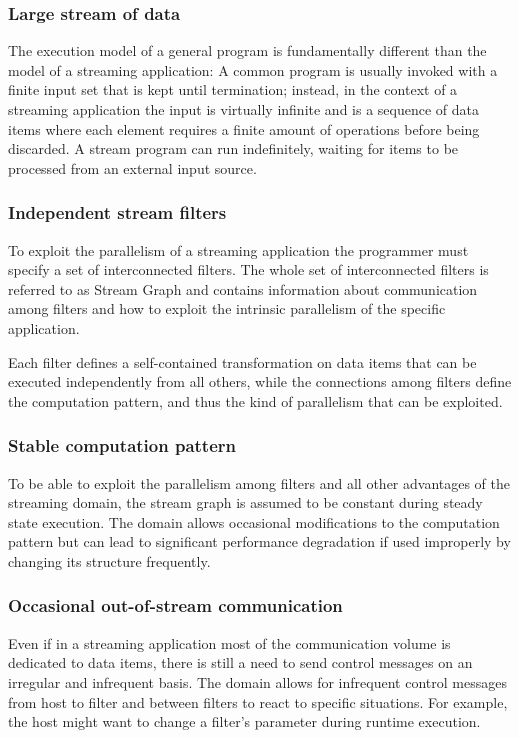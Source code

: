 \documentclass[../main.tex]{subfiles}
\begin{document}
\subsubsection{Large stream of data}
The execution model of a general program is fundamentally different than the model of a streaming application: A common program is usually invoked with a finite input set that is kept until termination; instead, in the context of a streaming application the input is virtually infinite and is a sequence of data items where each element requires a finite amount of operations before being discarded. A stream program can run indefinitely, waiting for items to be processed from an external input source.

\subsubsection{Independent stream filters}
To exploit the parallelism of a streaming application the programmer must specify a set of interconnected filters. The whole set of interconnected filters is referred to as Stream Graph and contains information about communication among filters and how to exploit the intrinsic parallelism of the specific application.

Each filter defines a self-contained transformation on data items that can be executed independently from all others, while the connections among filters define the computation pattern, and thus the kind of parallelism that can be exploited.

\subsubsection{Stable computation pattern}
To be able to exploit the parallelism among filters and all other advantages of the streaming domain, the stream graph is assumed to be constant during steady state execution. The domain allows occasional modifications to the computation pattern but can lead to significant performance degradation if used improperly by changing its structure frequently.

\subsubsection{Occasional out-of-stream communication}
Even if in a streaming application most of the communication volume is dedicated to data items, there is still a need to send control messages on an irregular and infrequent basis. The domain allows for infrequent control messages from host to filter and between filters to react to specific situations. For example, the host might want to change a filter's parameter during runtime execution.
\end{document}
